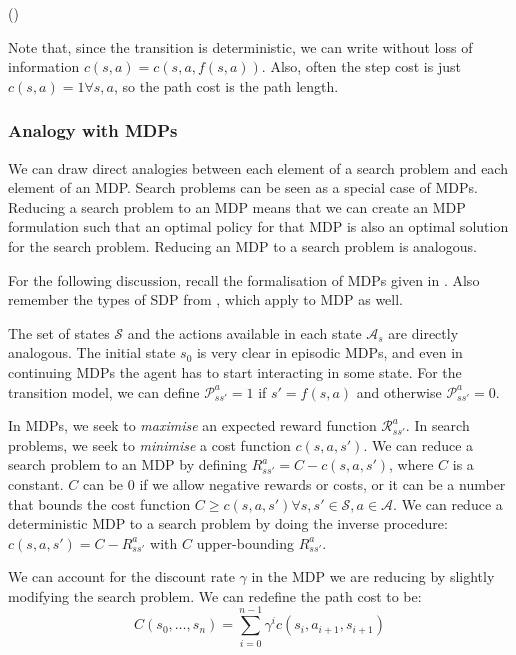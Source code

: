 (\cite[Section~3.1]{russell2009aima})

Note that, since the transition is deterministic, we can write without loss of
information $c(s, a) = c(s, a, f(s, a))$. Also, often the step cost is just
$c(s,a)=1 \forall s, a$, so the path cost is the path length. 

\subsubsection{Analogy with \acp{MDP}}
We can draw direct analogies between each element of a search problem and each
element of an \ac{MDP}. Search problems can be seen as a special case of
\acp{MDP}. Reducing a search problem to an \ac{MDP} means that we can create an
\ac{MDP} formulation such that an optimal policy for that \ac{MDP} is also an
optimal solution for the search problem. Reducing an \ac{MDP} to a search
problem is analogous.

For the following discussion, recall the formalisation of \acp{MDP} given in
. Also remember the types of \ac{SDP} from
, which apply to \ac{MDP} as well.

The set of states $\mathcal{S}$ and the actions available in each state
$\mathcal{A}_s$ are directly analogous. The initial state $s_0$ is very clear in
episodic \acp{MDP}, and even in continuing \acp{MDP} the agent has to start
interacting in some state. For the transition model, we can define
$\mathcal{P}^a_{ss'} = 1$ if $s' = f(s, a)$ and otherwise $\mathcal{P}^a_{ss'} =
0$.

In \acp{MDP}, we seek to \emph{maximise} an expected reward function
$\mathcal{R}^a_{ss'}$. In search problems, we seek to \emph{minimise} a cost
function $c(s, a, s')$. We can reduce a search problem to an \ac{MDP} by
defining $R^a_{ss'} = C - c(s, a, s')$, where $C$ is a constant. $C$ can be 0 if
we allow negative rewards or costs, or it can be a number that bounds the cost
function $C \geq c(s, a, s') \forall s,s' \in \mathcal{S}, a \in \mathcal{A}$.
We can reduce a deterministic \ac{MDP} to a search problem by doing the
inverse procedure: $c(s, a, s') = C -R^a_{ss'}$ with $C$ upper-bounding
$R^a_{ss'}$.

We can account for the discount rate $\gamma$ in the \ac{MDP} we are reducing by slightly
modifying the search problem. We can redefine the path cost to be:
\begin{equation}
C(s_0,\dots,s_n) = \sum_{i=0}^{n-1} \gamma^i c(s_i, a_{i+1}, s_{i+1})
\end{equation}

